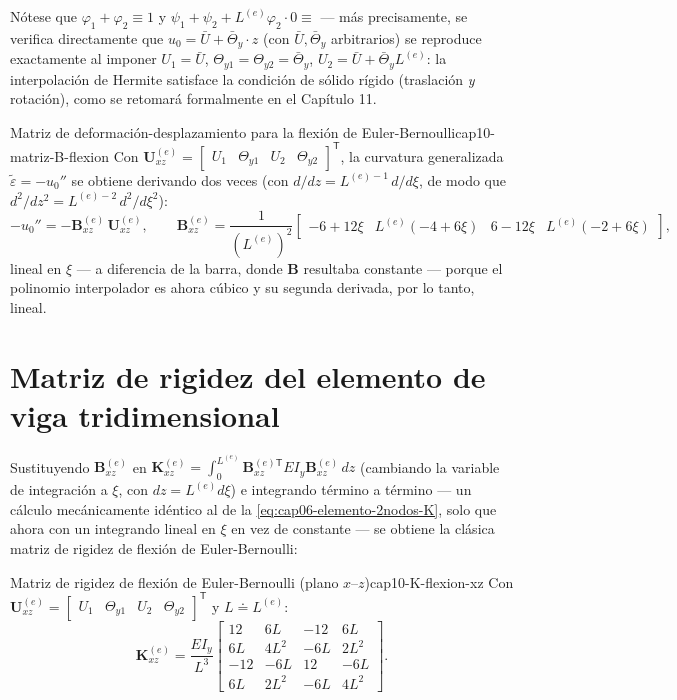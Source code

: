 Nótese que $\varphi_1+\varphi_2\equiv1$ y $\psi_1+\psi_2+L^{(e)}\varphi_2\cdot0\equiv$ --- más precisamente, se verifica directamente que $u_0=\bar U+\bar\Theta_y\cdot z$ (con $\bar U,\bar\Theta_y$ arbitrarios) se reproduce exactamente al imponer $U_1=\bar U$, $\Theta_{y1}=\Theta_{y2}=\bar\Theta_y$, $U_2=\bar U+\bar\Theta_y L^{(e)}$: la interpolación de Hermite satisface la condición de sólido rígido (traslación \emph{y} rotación), como se retomará formalmente en el Capítulo 11.

\begin{ecnimportante}{Matriz de deformación-desplazamiento para la flexión de Euler-Bernoulli}{cap10-matriz-B-flexion}
Con $\bm U^{(e)}_{xz}=\begin{bmatrix}U_1&\Theta_{y1}&U_2&\Theta_{y2}\end{bmatrix}^{\mathsf T}$, la curvatura generalizada $\tilde\varepsilon=-u_0''$ se obtiene derivando dos veces (con $d/dz = L^{(e)-1}\,d/d\xi$, de modo que $d^2/dz^2=L^{(e)-2}\,d^2/d\xi^2$):
\[
-u_0'' = -\bm B^{(e)}_{xz}\,\bm U^{(e)}_{xz}, \qquad
\bm B^{(e)}_{xz} = \frac{1}{(L^{(e)})^2}\begin{bmatrix} -6+12\xi & L^{(e)}(-4+6\xi) & 6-12\xi & L^{(e)}(-2+6\xi)\end{bmatrix} ,
\]
lineal en $\xi$ --- a diferencia de la barra, donde $\bm B$ resultaba constante --- porque el polinomio interpolador es ahora cúbico y su segunda derivada, por lo tanto, lineal.
\end{ecnimportante}

\section{Matriz de rigidez del elemento de viga tridimensional}
\label{sec:cap10-matriz-rigidez}

Sustituyendo $\bm B^{(e)}_{xz}$ en $\bm K^{(e)}_{xz}=\int_0^{L^{(e)}} \bm B_{xz}^{(e)\mathsf T} EI_y \bm B_{xz}^{(e)}\,dz$ (cambiando la variable de integración a $\xi$, con $dz=L^{(e)}d\xi$) e integrando término a término --- un cálculo mecánicamente idéntico al de la \cref{eq:cap06-elemento-2nodos-K}, solo que ahora con un integrando lineal en $\xi$ en vez de constante --- se obtiene la clásica matriz de rigidez de flexión de Euler-Bernoulli:

\begin{ecnimportante}{Matriz de rigidez de flexión de Euler-Bernoulli (plano \texorpdfstring{$x$--$z$}{x-z})}{cap10-K-flexion-xz}
Con $\bm U^{(e)}_{xz}=\begin{bmatrix}U_1&\Theta_{y1}&U_2&\Theta_{y2}\end{bmatrix}^{\mathsf T}$ y $L\doteq L^{(e)}$:
\[
\bm K^{(e)}_{xz} = \frac{EI_y}{L^3}
\begin{bmatrix}
12 & 6L & -12 & 6L \\
6L & 4L^2 & -6L & 2L^2 \\
-12 & -6L & 12 & -6L \\
6L & 2L^2 & -6L & 4L^2
\end{bmatrix} .
\]
\end{ecnimportante}

